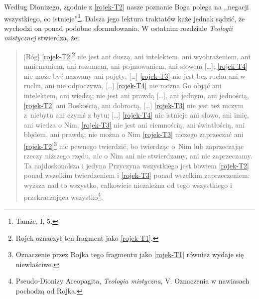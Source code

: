 Według Dionizego, zgodnie z \eqref{rojek-T2} nasze poznanie Boga polega na ,,negacji
wszystkiego, co istnieje''\footnote{Tamże, I, 5. }.
Dalsza jego lektura traktatów każe jednak sądzić, że wychodzi on ponad podobne sformułowania. W ostatnim
rozdziale \textit{Teologii mistycznej} stwierdza, że:

\begin{quote}
    [Bóg] \eqref{rojek-T2}\footnote{Rojek oznaczył ten fragment jako \eqref{rojek-T1}.} nie
jest ani duszą, ani intelektem, ani wyobrażeniem, ani mniemaniem, ani
rozumem, ani pojmowaniem, ani słowem […]; \eqref{rojek-T4} nie może być nazwany ani
pojęty; […] \eqref{rojek-T3} nie jest bez ruchu ani w ruchu, ani nie odpoczywa, […]
\eqref{rojek-T4} nie można Go objąć ani intelektem, ani wiedzą; nie jest ani prawdą
[…], ani jednym, ani jednością, \eqref{rojek-T2} ani Boskością, ani dobrocią, […]
\eqref{rojek-T3} nie jest też niczym z~niebytu ani czymś z bytu; […] \eqref{rojek-T4} nie
istnieje ani słowo, ani imię, ani wiedza o Nim; \eqref{rojek-T3} nie jest ani
ciemnością, ani światłością, ani błędem, ani prawdą; nie można o Nim
\eqref{rojek-T3} niczego zaprzeczać ani \eqref{rojek-T2}\footnote{Oznaczenie przez Rojka tego fragmentu
jako \eqref{rojek-T1} również wydaje się niewłaściwe.} nic pewnego
twierdzić, bo twierdząc o~Nim lub zaprzeczając rzeczy niższego rzędu,
nic o Nim ani nie stwierdzamy, ani nie zaprzeczamy. Ta najdoskonalsza i
jedyna Przyczyna wszystkiego jest bowiem \eqref{rojek-T2} ponad wszelkim
twierdzeniem i \eqref{rojek-T3} ponad wszelkim zaprzeczeniem: wyższa nad to
wszystko, całkowicie niezależna od tego wszystkiego i przekraczająca
wszystko\footnote{Pseudo-Dionizy Areopagita, \textit{Teologia mistyczna}, V. Oznaczenia w nawiasach pochodzą od Rojka.}.
\end{quote}





